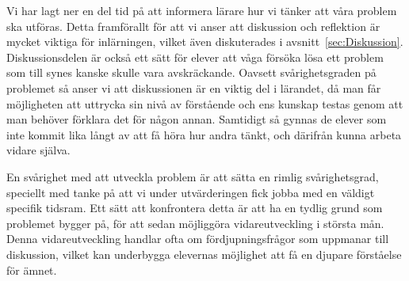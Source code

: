 \textcolor{Mahogany}{
    Vi har lagt ner en del tid på att informera lärare hur vi tänker att våra problem ska utföras. Detta framförallt för att vi anser att diskussion och reflektion är mycket viktiga för inlärningen, vilket även diskuterades i avsnitt~\ref{sec:Diskussion}. Diskussionsdelen är också ett sätt för elever att våga försöka lösa ett problem som till synes kanske skulle vara avskräckande. Oavsett svårighetsgraden på problemet så anser vi att diskussionen är en viktig del i lärandet, då man får möjligheten att uttrycka sin nivå av förstående och ens kunskap testas genom att man behöver förklara det för någon annan. Samtidigt så gynnas de elever som inte kommit lika långt av att få höra hur andra tänkt, och därifrån kunna arbeta vidare själva.
}

\textcolor{Mahogany}{
    En svårighet med att utveckla problem är att sätta en rimlig svårighetsgrad, speciellt med tanke på att vi under utvärderingen fick jobba med en väldigt specifik tidsram. Ett sätt att konfrontera detta är att ha en tydlig grund som problemet bygger på, för att sedan möjliggöra vidareutveckling i största mån. Denna vidareutveckling handlar ofta om fördjupningsfrågor som uppmanar till diskussion, vilket kan underbygga elevernas möjlighet att få en djupare förståelse för ämnet.
}